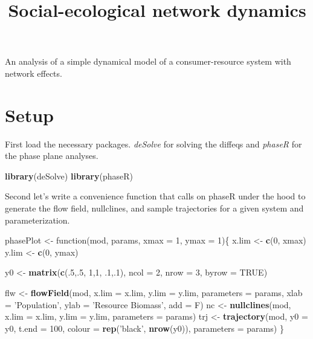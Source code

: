 \documentclass[]{article}
\title{Social-ecological network dynamics}
\author{}
\date{}
\newenvironment{Shaded}{\begin{snugshade}}{\end{snugshade}}
\newcommand{\KeywordTok}[1]{\textcolor[rgb]{0.13,0.29,0.53}{\textbf{{#1}}}}
\newcommand{\DataTypeTok}[1]{\textcolor[rgb]{0.13,0.29,0.53}{{#1}}}
\newcommand{\DecValTok}[1]{\textcolor[rgb]{0.00,0.00,0.81}{{#1}}}
\newcommand{\StringTok}[1]{\textcolor[rgb]{0.31,0.60,0.02}{{#1}}}
\newcommand{\OtherTok}[1]{\textcolor[rgb]{0.56,0.35,0.01}{{#1}}}
\newcommand{\NormalTok}[1]{{#1}}
\begin{document}
\maketitle

An analysis of a simple dynamical model of a consumer-resource system
with network effects.

\section{Setup}\label{setup}

First load the necessary packages. \emph{deSolve} for solving the
diffeqs and \emph{phaseR} for the phase plane analyses.

\begin{Shaded}
\begin{Highlighting}[]
\KeywordTok{library}\NormalTok{(deSolve)}
\KeywordTok{library}\NormalTok{(phaseR)}
\end{Highlighting}
\end{Shaded}

Second let's write a convenience function that calls on phaseR under the
hood to generate the flow field, nullclines, and sample trajectories for
a given system and parameterization.

\begin{Shaded}
\begin{Highlighting}[]
\NormalTok{phasePlot <-}\StringTok{ }\NormalTok{function(mod, params, }\DataTypeTok{xmax =} \DecValTok{1}\NormalTok{, }\DataTypeTok{ymax =} \DecValTok{1}\NormalTok{)\{}
  \NormalTok{x.lim <-}\StringTok{ }\KeywordTok{c}\NormalTok{(}\DecValTok{0}\NormalTok{, xmax)}
  \NormalTok{y.lim <-}\StringTok{ }\KeywordTok{c}\NormalTok{(}\DecValTok{0}\NormalTok{, ymax)}
  
  \NormalTok{y0 <-}\StringTok{ }\KeywordTok{matrix}\NormalTok{(}\KeywordTok{c}\NormalTok{(.}\DecValTok{5}\NormalTok{,.}\DecValTok{5}\NormalTok{, }\DecValTok{1}\NormalTok{,}\DecValTok{1}\NormalTok{, .}\DecValTok{1}\NormalTok{,.}\DecValTok{1}\NormalTok{),}
             \DataTypeTok{ncol =} \DecValTok{2}\NormalTok{, }\DataTypeTok{nrow =} \DecValTok{3}\NormalTok{,}
             \DataTypeTok{byrow =} \OtherTok{TRUE}\NormalTok{)  }
  
  \NormalTok{flw <-}\StringTok{ }\KeywordTok{flowField}\NormalTok{(mod, }\DataTypeTok{x.lim =} \NormalTok{x.lim, }\DataTypeTok{y.lim =} \NormalTok{y.lim, }\DataTypeTok{parameters =} \NormalTok{params, }
                   \DataTypeTok{xlab =} \StringTok{'Population'}\NormalTok{, }\DataTypeTok{ylab =} \StringTok{'Resource Biomass'}\NormalTok{, }\DataTypeTok{add =} \NormalTok{F)}
  \NormalTok{nc <-}\StringTok{ }\KeywordTok{nullclines}\NormalTok{(mod, }\DataTypeTok{x.lim =} \NormalTok{x.lim, }\DataTypeTok{y.lim =} \NormalTok{y.lim, }\DataTypeTok{parameters =} \NormalTok{params)}
  \NormalTok{trj <-}\StringTok{ }\KeywordTok{trajectory}\NormalTok{(mod, }\DataTypeTok{y0 =} \NormalTok{y0, }\DataTypeTok{t.end =} \DecValTok{100}\NormalTok{, }\DataTypeTok{colour =} \KeywordTok{rep}\NormalTok{(}\StringTok{'black'}\NormalTok{, }\KeywordTok{nrow}\NormalTok{(y0)), }\DataTypeTok{parameters =} \NormalTok{params)}
\NormalTok{\}}
\end{Highlighting}
\end{Shaded}
\end{document}
